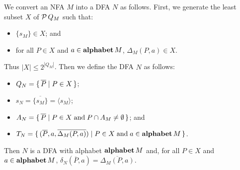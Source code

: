 We convert an NFA $M$ into a DFA $N$ as follows.  First,
we generate the least subset $X$ of ${\cal P} \,Q_M$ such that:
\begin{itemize}
\item $\{s_M\}\in X$; and

\item for all $P\in X$ and $a\in\mathbf{alphabet}\,M$,
$\Delta_M(P,a)\in X$.
\end{itemize}
Thus $|X|\leq 2^{|Q_M|}$.  Then we define the DFA $N$ as follows:
\begin{itemize}
\item $Q_N=\{ \, \overline{P} \mid P\in X \, \}$;

\item $s_N=\overline{\{s_M\}}=\langle s_M\rangle$;

\item $A_N=\{ \, \overline{P} \mid P\in X\;\allowbreak\mbox{and}\allowbreak\;P\cap A_M\neq\emptyset \, \}$;
  and

\item $T_N=\{ \, (\overline{P},a,
\overline{\Delta_M(P,a)}) \mid P\in X\;\allowbreak\mbox{and}\allowbreak\;a\in\mathbf{alphabet}\,M \, \}$.
\end{itemize}
Then $N$ is a DFA with alphabet $\mathbf{alphabet}\,M$ and, for all $P\in X$ and
$a\in\mathbf{alphabet}\,M$, $\delta_N(\overline{P},a)=\overline{\Delta_M(P,a)}$.

